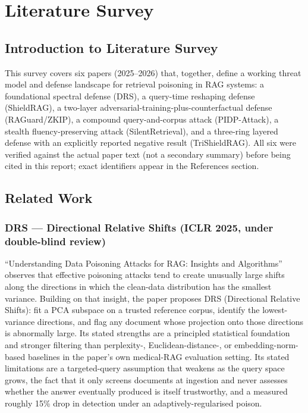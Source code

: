 \section{Literature Survey}
\label{sec:literature}

\subsection{Introduction to Literature Survey}

This survey covers six papers (2025--2026) that, together, define a
working threat model and defense landscape for retrieval poisoning in RAG
systems: a foundational spectral defense (DRS), a query-time reshaping
defense (ShieldRAG), a two-layer adversarial-training-plus-counterfactual
defense (RAGuard/ZKIP), a compound query-and-corpus attack (PIDP-Attack),
a stealth fluency-preserving attack (SilentRetrieval), and a three-ring
layered defense with an explicitly reported negative result
(TriShieldRAG). All six were verified against the actual paper text (not
a secondary summary) before being cited in this report; exact identifiers
appear in the References section.

\subsection{Related Work}

\subsubsection{DRS --- Directional Relative Shifts (ICLR 2025, under double-blind review)}

``Understanding Data Poisoning Attacks for RAG: Insights and Algorithms''
observes that effective poisoning attacks tend to create unusually large
shifts along the directions in which the clean-data distribution has the
smallest variance. Building on that insight, the paper proposes DRS
(Directional Relative Shifts): fit a PCA subspace on a trusted reference
corpus, identify the lowest-variance directions, and flag any document
whose projection onto those directions is abnormally large. Its stated
strengths are a principled statistical foundation and stronger filtering
than perplexity-, Euclidean-distance-, or embedding-norm-based baselines
in the paper's own medical-RAG evaluation setting. Its stated limitations
are a targeted-query assumption that weakens as the query space grows,
the fact that it only screens documents at ingestion and never assesses
whether the answer eventually produced is itself trustworthy, and a
measured roughly 15\% drop in detection under an adaptively-regularised
poison.

